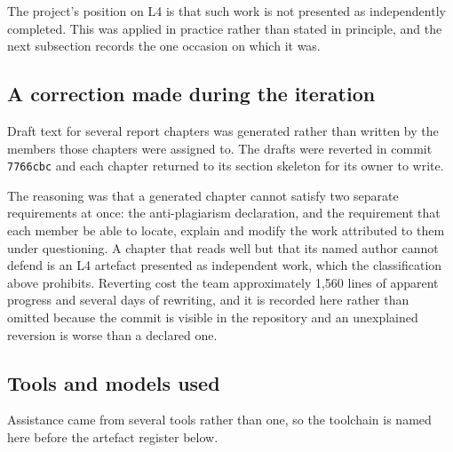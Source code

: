 The project's position on L4 is that such work is not presented as
independently completed. This was applied in practice rather than stated in
principle, and the next subsection records the one occasion on which it was.

\subsection*{A correction made during the iteration}

Draft text for several report chapters was generated rather than written by the
members those chapters were assigned to. The drafts were reverted in commit
\texttt{7766cbc} and each chapter returned to its section skeleton for its
owner to write.

The reasoning was that a generated chapter cannot satisfy two separate
requirements at once: the anti-plagiarism declaration, and the requirement that
each member be able to locate, explain and modify the work attributed to them
under questioning. A chapter that reads well but that its named author cannot
defend is an L4 artefact presented as independent work, which the classification
above prohibits. Reverting cost the team approximately 1,560 lines of apparent
progress and several days of rewriting,
and it is recorded here rather than omitted because
the commit is visible in the repository and an unexplained reversion is worse
than a declared one.

\subsection*{Tools and models used}

Assistance came from several tools rather than one, so the toolchain is named
here before the artefact register below.

